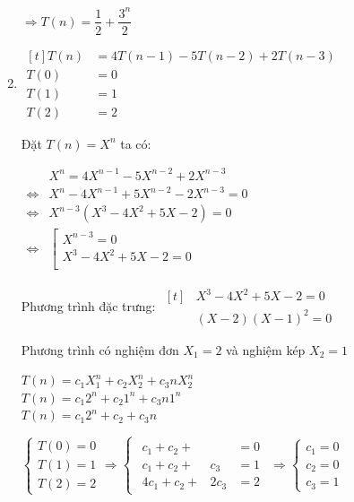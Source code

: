 \documentclass[12pt, letterpaper]{article}
\begin{document}
\begin{enumerate}
        $ \Rightarrow T(n) = \dfrac{1}{2} + \dfrac{3^n}{2} $

    \item $ \begin{aligned}[t]
            T(n) &= 4T(n - 1) - 5T(n - 2) + 2T(n - 3) \\
            T(0) &= 0 \\
            T(1) &= 1 \\
            T(2) &= 2
    \end{aligned} $

        Đặt $ T(n) = X^n $ ta có:

        $ \begin{aligned}
            & X^n = 4X^{n - 1} - 5X^{n - 2} + 2X^{n - 3} \\
            \Leftrightarrow & X^n - 4X^{n - 1} + 5X^{n - 2} - 2X^{n - 3} = 0 \\
            \Leftrightarrow & X^{n - 3}(X^3 - 4X^2 + 5X - 2) = 0 \\
            \Leftrightarrow & \left[
            \begin{array}{ll}
                X^{n - 3} = 0 \\
                X^3 - 4X^2 + 5X - 2 = 0 \\
            \end{array}
            \right .
        \end{aligned} $

        Phương trình đặc trưng: $ \begin{aligned}[t]
            & X^3 - 4X^2 + 5X - 2 = 0 \\
            & (X - 2){(X - 1)}^2 = 0
        \end{aligned} $

        Phương trình có nghiệm đơn $ X_1 = 2 $ và nghiệm kép $ X_2 = 1 $

        $ T(n) = c_1X_1^n + c_2X_2^n + c_3nX_2^n $ \\
        $ T(n) = c_1 2^n + c_2 1^n + c_3n 1^n $ \\
        $ T(n) = c_1 2^n + c_2 + c_3n $

        $ \begin{cases}
            T(0) = 0 \\
            T(1) = 1 \\
            T(2) = 2
        \end{cases}
        \Rightarrow{}
        \begin{cases}
            \begin{aligned}
                c_1 + c_2 + & &= 0 \\
                c_1 + c_2 + & c_3 &= 1 \\
                4c_1 + c_2 + & 2c_3 &= 2
            \end{aligned}
        \end{cases}
        \Rightarrow{}
        \begin{cases}
            c_1 = 0 \\
            c_2 = 0 \\
            c_3 = 1
        \end{cases} $


\end{enumerate}
\end{document}
